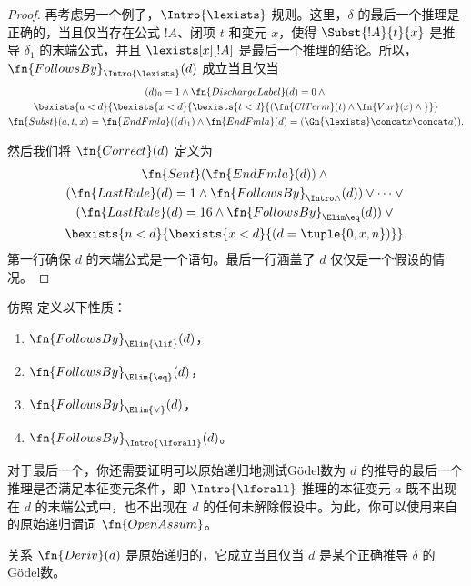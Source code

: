 \documentclass[../../../include/open-logic-section]{subfiles}
\begin{document}
\begin{proof}
  再考虑另一个例子，$\Intro{\lexists}$ 规则。这里，$\delta$ 的最后一个推理是正确的，当且仅当存在公式 $!A$、闭项 $t$ 和变元 $x$，使得 $\Subst{!A}{t}{x}$ 是推导 $\delta_1$ 的末端公式，并且 $\lexists[x][!A]$ 是最后一个推理的结论。所以，$\fn{FollowsBy}_{\Intro{\lexists}}(d)$ 成立当且仅当
  \begin{multline*}
    (d)_0 = 1 \land \fn{DischargeLabel}(d) = 0 \land {} \\
    \bexists{a < d}{\bexists{x<d}{\bexists{t<d}{
          (\fn{ClTerm}(t) \land \fn{Var}(x)  \land {}}}}\\
    \fn{Subst}(a,t,x) = \fn{EndFmla}((d)_1) \land
    \fn{EndFmla}(d) = (\Gn{\lexists} \concat x \concat a)).
  \end{multline*}

  然后我们将 $\fn{Correct}(d)$ 定义为
  \begin{multline*}
    \fn{Sent}(\fn{EndFmla}(d)) \land {}\\
    (\fn{LastRule}(d) = 1 \land
    \fn{FollowsBy}_{\Intro\land}(d)) \lor \dots \lor {}\\
    (\fn{LastRule}(d) = 16 \land \fn{FollowsBy}_{\Elim\eq}(d)) \lor {}\\
    \bexists{n<d}{\bexists{x<d}{(d = \tuple{0, x, n})}}.
  \end{multline*}
  第一行确保 $d$ 的末端公式是一个语句。最后一行涵盖了 $d$ 仅仅是一个假设的情况。
\end{proof}

\begin{prob}
  仿照  定义以下性质：
  \begin{enumerate}
  \item $\fn{FollowsBy}_{\Elim{\lif}}(d)$，
  \item $\fn{FollowsBy}_{\Elim{\eq}}(d)$，
  \item $\fn{FollowsBy}_{\Elim{\lor}}(d)$，
  \item $\fn{FollowsBy}_{\Intro{\lforall}}(d)$。
  \end{enumerate}
  对于最后一个，你还需要证明可以原始递归地测试Gödel数为 $d$ 的推导的最后一个推理是否满足本征变元条件，即 $\Intro{\lforall}$ 推理的本征变元 $a$ 既不出现在 $d$ 的末端公式中，也不出现在 $d$ 的任何未解除假设中。为此，你可以使用来自
   的原始递归谓词 $\fn{OpenAssum}$。
\end{prob}

\begin{prop}
  关系 $\fn{Deriv}(d)$ 是原始递归的，它成立当且仅当 $d$ 是某个正确推导 $\delta$ 的Gödel数。
\end{prop}
\end{document}
